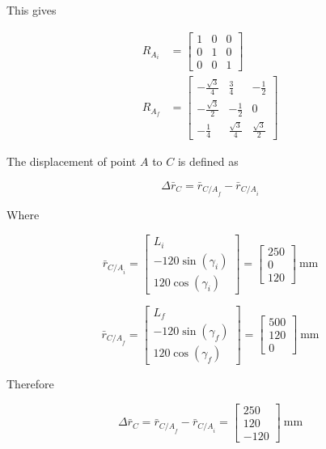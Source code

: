 \documentclass[12pt, letterpaper]{../assignment}
\begin{document}
This gives

\begin{equation*}
\begin{aligned}
    R_{A_i} &= \left[\begin{array}{ccc} 1 & 0 & 0\\ 0 & 1 & 0\\ 0 & 0 & 1 \end{array}\right]\\
    R_{A_f} &= \left[\begin{array}{ccc} -\frac{\sqrt{3}}{4} & \frac{3}{4} & -\frac{1}{2}\\ -\frac{\sqrt{3}}{2} & -\frac{1}{2} & 0\\ -\frac{1}{4} & \frac{\sqrt{3}}{4} & \frac{\sqrt{3}}{2} \end{array}\right]
\end{aligned}
\end{equation*}

The displacement of point $A$ to $C$ is defined as

$$ \Delta \bar{r}_C = \bar{r}_{{C/A}_f} - \bar{r}_{{C/A}_i}  $$

Where

$$ \bar{r}_{{C/A}_i} = \left[\begin{array}{r} L_i \\-120 \sin(\gamma_i) \\120 \cos(\gamma_i) \end{array}\right]
= \left[\begin{array}{c} 250\\ 0\\ 120 \end{array}\right] \ \text{mm} $$

$$ \bar{r}_{{C/A}_f} = \left[\begin{array}{r} L_f \\-120 \sin(\gamma_f) \\120 \cos(\gamma_f) \end{array}\right]
= \left[\begin{array}{c} 500\\ 120\\ 0 \end{array}\right] \ \text{mm} $$

Therefore

$$ \Delta \bar{r}_C = \bar{r}_{{C/A}_f} - \bar{r}_{{C/A}_i} 
= \left[\begin{array}{r} 250\\ 120\\ -120 \end{array}\right] \ \text{mm} $$
\end{document}
